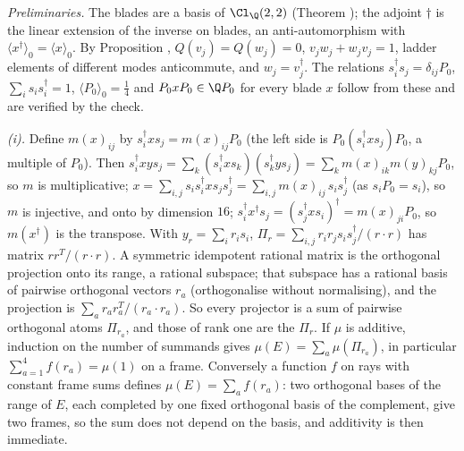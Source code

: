 \emph{Preliminaries.} The blades are a basis of $\Cl_{\Q}(2,2)$ (Theorem ); the adjoint $\dagger$ is the linear extension of the inverse on blades, an anti-automorphism with $\langle x^{\dagger}\rangle_{0} = \langle x\rangle_{0}$. By Proposition , $Q(v_{j}) = Q(w_{j}) = 0$, $v_{j}w_{j} + w_{j}v_{j} = 1$, ladder elements of different modes anticommute, and $w_{j} = v_{j}^{\dagger}$. The relations $s_{i}^{\dagger}s_{j} = \delta_{ij}P_{0}$, $\sum_{i}s_{i}s_{i}^{\dagger} = 1$, $\langle P_{0}\rangle_{0} = \tfrac14$ and $P_{0}xP_{0} \in \Q P_{0}$ for every blade $x$ follow from these and are verified by the check.

\emph{(i).} Define $m(x)_{ij}$ by $s_{i}^{\dagger}xs_{j} = m(x)_{ij}P_{0}$ (the left side is $P_{0}(s_{i}^{\dagger}xs_{j})P_{0}$, a multiple of $P_{0}$). Then $s_{i}^{\dagger}xys_{j} = \sum_{k}(s_{i}^{\dagger}xs_{k})(s_{k}^{\dagger}ys_{j}) = \sum_{k}m(x)_{ik}m(y)_{kj}P_{0}$, so $m$ is multiplicative; $x = \sum_{i,j}s_{i}s_{i}^{\dagger}xs_{j}s_{j}^{\dagger} = \sum_{i,j}m(x)_{ij}\,s_{i}s_{j}^{\dagger}$ (as $s_{i}P_{0} = s_{i}$), so $m$ is injective, and onto by dimension $16$; $s_{i}^{\dagger}x^{\dagger}s_{j} = (s_{j}^{\dagger}xs_{i})^{\dagger} = m(x)_{ji}P_{0}$, so $m(x^{\dagger})$ is the transpose. With $y_{r} = \sum_{i}r_{i}s_{i}$, $\Pi_{r} = \sum_{i,j}r_{i}r_{j}s_{i}s_{j}^{\dagger}/(r \cdot r)$ has matrix $rr^{T}/(r \cdot r)$. A symmetric idempotent rational matrix is the orthogonal projection onto its range, a rational subspace; that subspace has a rational basis of pairwise orthogonal vectors $r_{a}$ (orthogonalise without normalising), and the projection is $\sum_{a}r_{a}r_{a}^{T}/(r_{a} \cdot r_{a})$. So every projector is a sum of pairwise orthogonal atoms $\Pi_{r_{a}}$, and those of rank one are the $\Pi_{r}$. If $\mu$ is additive, induction on the number of summands gives $\mu(E) = \sum_{a}\mu(\Pi_{r_{a}})$, in particular $\sum_{a=1}^{4}f(r_{a}) = \mu(1)$ on a frame. Conversely a function $f$ on rays with constant frame sums defines $\mu(E) = \sum_{a}f(r_{a})$: two orthogonal bases of the range of $E$, each completed by one fixed orthogonal basis of the complement, give two frames, so the sum does not depend on the basis, and additivity is then immediate.


